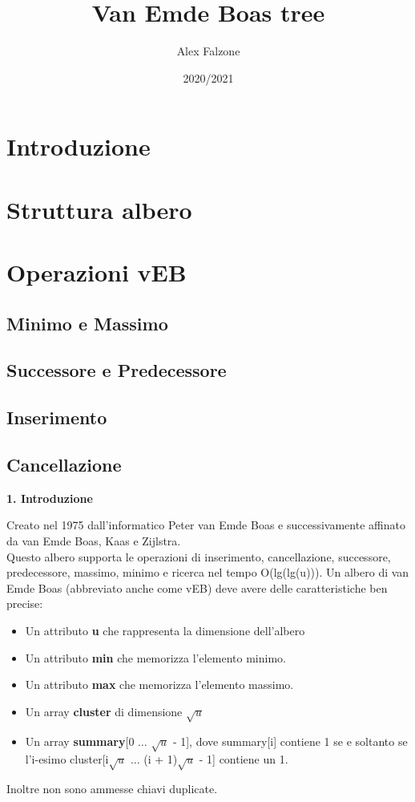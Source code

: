 \documentclass{article}
\title{\textbf{Van Emde Boas tree}}
\author{Alex Falzone }
\date{2020/2021}
\begin{document}
\maketitle
\section{Introduzione}
\section{Struttura albero}
\section{Operazioni vEB}
\subsection{Minimo e Massimo}
\subsection{Successore e Predecessore}
\subsection{Inserimento}
\subsection{Cancellazione}
\newpage

\begin{flushleft}
\huge \textbf{1. Introduzione}
\newline
\newline
\normalsize
    
    Creato nel 1975 dall'informatico Peter van Emde Boas e successivamente affinato da van Emde Boas, Kaas e Zijlstra.\\
    Questo albero supporta le operazioni di inserimento, cancellazione, successore, predecessore, massimo, minimo e ricerca nel tempo O(lg(lg(u))).
    Un albero di van Emde Boas (abbreviato anche come vEB) deve avere delle caratteristiche ben precise:
    \begin{itemize}
        \item Un attributo \textbf{u} che rappresenta la dimensione dell'albero
        \item Un attributo \textbf{min} che memorizza l'elemento minimo.
        \item Un attributo \textbf{max} che memorizza l'elemento massimo.
        \item Un array \textbf{cluster} di dimensione $\sqrt{u}$
        \item Un array \textbf{summary}[0 $\dots$ $\sqrt{u}$ - 1], dove summary[i] contiene 1 se e soltanto se l'i-esimo cluster[i$\sqrt{u}$ $\dots$ (i + 1)$\sqrt{u}$ - 1] contiene un 1.
    \end{itemize}
    Inoltre non sono ammesse chiavi duplicate.\\
\end{flushleft}
\end{document}
